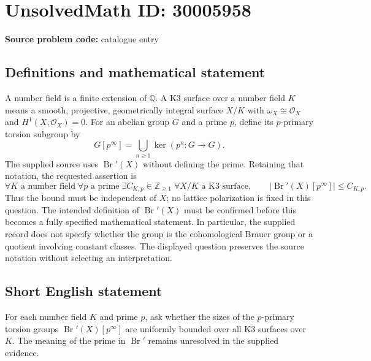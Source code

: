 \documentclass[11pt]{article}
\newcommand{\Z}{\mathbb{Z}}
\newcommand{\Q}{\mathbb{Q}}
\begin{document}
\section*{UnsolvedMath ID: 30005958}
\textbf{Source problem code:} catalogue entry
\subsection{Definitions and mathematical statement}
A number field is a finite extension of \(\Q\). A K3 surface over a number field \(K\) means a smooth, projective, geometrically integral surface \(X/K\) with \(\omega_X\cong\mathcal O_X\) and \(H^1(X,\mathcal O_X)=0\). For an abelian group \(G\) and a prime \(p\), define its \(p\)-primary torsion subgroup by
\[
G[p^\infty]=\bigcup_{n\geq 1}\ker(p^n:G\longrightarrow G).
\]
The supplied source uses \(\operatorname{Br}'(X)\) without defining the prime. Retaining that notation, the requested assertion is
\[
\forall K\text{ a number field}\;\forall p\text{ a prime}\;\exists C_{K,p}\in\Z_{\geq 1}\;\forall X/K\text{ a K3 surface},\qquad
\left|\operatorname{Br}'(X)[p^\infty]\right|\leq C_{K,p}.
\]
Thus the bound must be independent of \(X\); no lattice polarization is fixed in this question. The intended definition of \(\operatorname{Br}'(X)\) must be confirmed before this becomes a fully specified mathematical statement. In particular, the supplied record does not specify whether the group is the cohomological Brauer group or a quotient involving constant classes. The displayed question preserves the source notation without selecting an interpretation.
\subsection{Short English statement}
For each number field \(K\) and prime \(p\), ask whether the sizes of the \(p\)-primary torsion groups \(\operatorname{Br}'(X)[p^\infty]\) are uniformly bounded over all K3 surfaces over \(K\). The meaning of the prime in \(\operatorname{Br}'\) remains unresolved in the supplied evidence.
\end{document}
